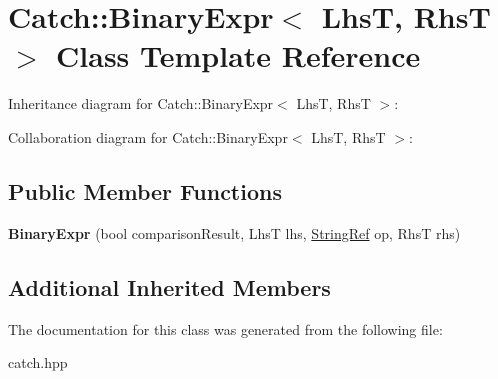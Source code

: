 \hypertarget{classCatch_1_1BinaryExpr}{}\section{Catch\+:\+:Binary\+Expr$<$ LhsT, RhsT $>$ Class Template Reference}
\label{classCatch_1_1BinaryExpr}


Inheritance diagram for Catch\+:\+:Binary\+Expr$<$ LhsT, RhsT $>$\+:


Collaboration diagram for Catch\+:\+:Binary\+Expr$<$ LhsT, RhsT $>$\+:
\subsection*{Public Member Functions}
\begin{DoxyCompactItemize}
\item 
{\bfseries Binary\+Expr} (bool comparison\+Result, LhsT lhs, \hyperlink{classCatch_1_1StringRef}{String\+Ref} op, RhsT rhs)\hypertarget{classCatch_1_1BinaryExpr_a657d66346aef97a760c22776fe6008b6}{}\label{classCatch_1_1BinaryExpr_a657d66346aef97a760c22776fe6008b6}

\end{DoxyCompactItemize}
\subsection*{Additional Inherited Members}


The documentation for this class was generated from the following file\+:\begin{DoxyCompactItemize}
\item 
catch.\+hpp\end{DoxyCompactItemize}
